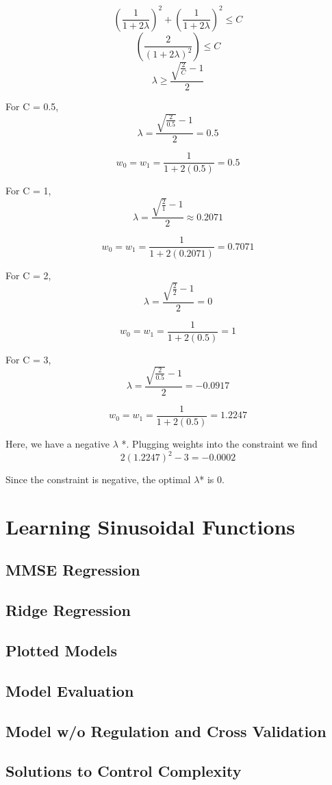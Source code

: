 \documentclass{article}
\begin{document}
\[(\frac{1}{1+2\lambda})^2 + (\frac{1}{1+2\lambda})^2  \leq C\]
\[(\frac{2}{(1+2\lambda)^2}) \leq C\]
\[\lambda \ge \frac{\sqrt{\frac{2}{C}} - 1}{2}\]

For C = 0.5, 
\[\lambda = \frac{\sqrt{\frac{2}{0.5}} - 1}{2} = 0.5\]

\[w_0 = w_1 = \frac{1}{1+2(0.5)} = 0.5 \]

For C = 1, 
\[\lambda = \frac{\sqrt{\frac{2}{1}} - 1}{2} \approx 0.2071 \]

\[w_0 = w_1 = \frac{1}{1+2(0.2071)} = 0.7071 \]

For C = 2, 
\[\lambda = \frac{\sqrt{\frac{2}{2}} - 1}{2} = 0\]

\[w_0 = w_1 = \frac{1}{1+2(0.5)} = 1 \]

For C = 3, 
\[\lambda = \frac{\sqrt{\frac{2}{0.5}} - 1}{2} = -0.0917\]

\[w_0 = w_1 = \frac{1}{1+2(0.5)} = 1.2247 \]

Here, we have a negative $\lambda$ *. Plugging weights into the constraint we find
\[2(1.2247)^2 - 3 = -0.0002 \] 

Since the constraint is negative, the optimal $\lambda$* is 0.

\section{Learning Sinusoidal Functions}
\subsection{MMSE Regression}
\subsection{Ridge Regression}
\subsection{Plotted Models}
\subsection{Model Evaluation}
\subsection{Model w/o Regulation and Cross Validation}
\subsection{Solutions to Control Complexity}
\end{document}
